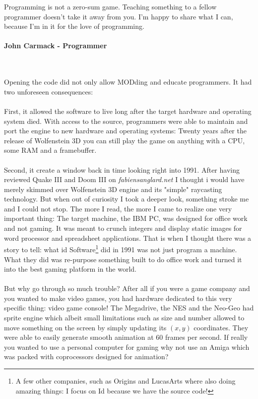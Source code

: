  \begin{fancyquotes}
   Programming is not a zero-sum game. Teaching something to a fellow programmer doesn't take it away from you. I'm happy to share what I can, because I'm in it for the love of programming.\\
   \\
\textbf{John Carmack - Programmer}
 \end{fancyquotes}\\
\\
Opening the code did not only allow MODding and educate programmers. It had two unforeseen consequences:\\
\\
First, it allowed the software to live long after the target hardware and operating system died. With access to the source, programmers were able to maintain and port the engine to new hardware and operating systems: Twenty years after the release of Wolfenstein 3D you can still play the game on anything with a CPU, some RAM and a framebuffer. \\
\\
Second, it create a window back in time looking right into 1991. After having reviewed Quake III and Doom III on \emph{fabiensanglard.net} I thought i would have merely skimmed over Wolfenstein 3D engine and its "simple" raycasting technology. But when out of curiosity I took a deeper look, something stroke me and I could not stop. The more I read, the more I came to realize one very important thing: The target machine, the IBM PC, was designed for office work and not gaming. It was meant to crunch integers and display static images for word processor and spreadsheet applications. That is when I thought there was a story to tell: what id Software\footnote{A few other companies, such as Origins and LucasArts where also doing amazing things: I focus on Id because we have the source code!} did in 1991 was not just program a machine. What they did was re-purpose something built to do office work and turned it into the best gaming platform in the world.\\
\\
But why go through so much trouble? After all if you were a game company and you wanted to make video games, you had hardware dedicated to this very specific thing: video game console! The Megadrive, the NES and the Neo-Geo had sprite engine which albeit small limitations such as size and number allowed to move something on the screen by simply updating its $(x,y)$ coordinates. They were able to easily generate smooth animation at 60 frames per second. If really you wanted to use a personal computer for gaming why not use an Amiga which was packed with coprocessors designed for animation?\\
